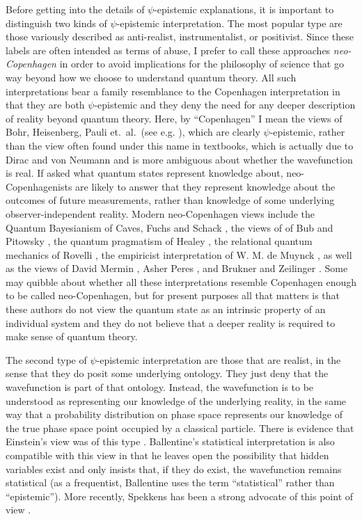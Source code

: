 \documentclass[DIV=calc,paper=a4,fontsize=11pt,twocolumn]{scrartcl} %
\theoremstyle{definition}
\theoremstyle{plain}
\begin{document}
Before getting into the details of $\psi$-epistemic explanations, it
is important to distinguish two kinds of $\psi$-epistemic
interpretation.  The most popular type are those variously described
as anti-realist, instrumentalist, or positivist.  Since these labels
are often intended as terms of abuse, I prefer to call these
approaches \emph{neo-Copenhagen} in order to avoid implications for
the philosophy of science that go way beyond how we choose to
understand quantum theory.  All such interpretations bear a family
resemblance to the Copenhagen interpretation in that they are both
$\psi$-epistemic and they deny the need for any deeper description of
reality beyond quantum theory.  Here, by ``Copenhagen'' I mean the
views of Bohr, Heisenberg, Pauli et.\ al.\ (see e.g. \cite{Faye2008}),
which are clearly $\psi$-epistemic, rather than the view often found
under this name in textbooks, which is actually due to Dirac
\cite{Dirac1958} and von Neumann \cite{Neumann1955} and is more
ambiguous about whether the wavefunction is real.  If asked what
quantum states represent knowledge about, neo-Copenhagenists are
likely to answer that they represent knowledge about the outcomes of
future measurements, rather than knowledge of some underlying
observer-independent reality.  Modern neo-Copenhagen views include the
Quantum Bayesianism of Caves, Fuchs and Schack \cite{Fuchs2010,
Fuchs2010a, Fuchs2013}, the views of of Bub and Pitowsky
\cite{Pitowsky2006}, the quantum pragmatism of Healey
\cite{Healey2012}, the relational quantum mechanics of Rovelli
\cite{Rovelli1996}, the empiricist interpretation of W. M. de Muynck
\cite{Muynck2002}, as well as the views of David Mermin
\cite{Mermin2013}, Asher Peres \cite{Peres1995}, and Brukner and
Zeilinger \cite{Brukner2003}.  Some may quibble about whether all
these interpretations resemble Copenhagen enough to be called
neo-Copenhagen, but for present purposes all that matters is that
these authors do not view the quantum state as an intrinsic property
of an individual system and they do not believe that a deeper reality
is required to make sense of quantum theory.

The second type of $\psi$-epistemic interpretation are those that are
realist, in the sense that they do posit some underlying ontology.
They just deny that the wavefunction is part of that ontology.
Instead, the wavefunction is to be understood as representing our
knowledge of the underlying reality, in the same way that a
probability distribution on phase space represents our knowledge of
the true phase space point occupied by a classical particle.  There is
evidence that Einstein's view was of this type \cite{Harrigan2010}.
Ballentine's statistical interpretation \cite{Ballentine1970} is also
compatible with this view in that he leaves open the possibility that
hidden variables exist and only insists that, if they do exist, the
wavefunction remains statistical (as a frequentist, Ballentine uses
the term ``statistical'' rather than ``epistemic'').  More recently,
Spekkens has been a strong advocate of this point of view
\cite{Spekkens2007}.
\end{document}
